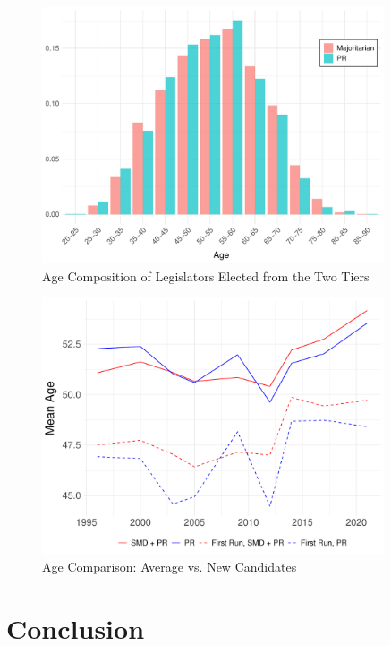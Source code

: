\documentclass[a4paper, 11pt]{article}
\begin{document}



\begin{figure}[!htbp]
	\includegraphics[width = 0.9\textwidth]{../figure/paper/age_smd_vs_pr_winners.pdf}
	\caption{Age Composition of Legislators Elected from the Two Tiers}
	\label{fig:pr_vs_smd}
\end{figure}



\begin{figure}[!htbp]
	\includegraphics[width = 0.9\textwidth]{../figure/paper/age_first_run.pdf}
	\caption{Age Comparison: Average vs. New Candidates}
	\label{fig:ageFirstRun}
\end{figure}



\section{Conclusion}
\end{document}
